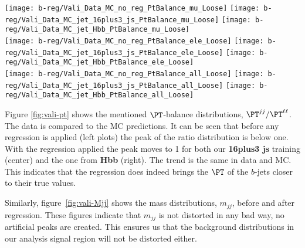 \begin{figure*}[thb]
  \centering
  \texttt{[image: b-reg/Vali\_Data\_MC\_no\_reg\_PtBalance\_mu\_Loose]}\hfil
  \texttt{[image: b-reg/Vali\_Data\_MC\_jet\_16plus3\_js\_PtBalance\_mu\_Loose]}\hfil
  \texttt{[image: b-reg/Vali\_Data\_MC\_jet\_Hbb\_PtBalance\_mu\_Loose]}\hfil\\
  \texttt{[image: b-reg/Vali\_Data\_MC\_no\_reg\_PtBalance\_ele\_Loose]}\hfil
  \texttt{[image: b-reg/Vali\_Data\_MC\_jet\_16plus3\_js\_PtBalance\_ele\_Loose]}\hfil
  \texttt{[image: b-reg/Vali\_Data\_MC\_jet\_Hbb\_PtBalance\_ele\_Loose]}\hfil\\
  \texttt{[image: b-reg/Vali\_Data\_MC\_no\_reg\_PtBalance\_all\_Loose]}\hfil
  \texttt{[image: b-reg/Vali\_Data\_MC\_jet\_16plus3\_js\_PtBalance\_all\_Loose]}\hfil
  \texttt{[image: b-reg/Vali\_Data\_MC\_jet\_Hbb\_PtBalance\_all\_Loose]}\hfil\\
  \caption{Pt balance (ratio) of the di-jet and di-lepton. On the left
    are plots with no regression, in the center - using
    \textbf{16plus3 js} training and on the right - using \textbf{Hbb}
    regression.  Top plots for muon channel, middle for electron
    channel and bottom is the combination (sum) of the two.  }
  \label{fig:vali-pt}
\end{figure*}


Figure \ref{fig:vali-pt} shows the mentioned $\PT$-balance
distributions, $\PT^{jj}/\PT^{\ell\ell}$.  The data is compared to the
MC predictions. It can be seen that before any regression is applied
(left plots) the peak of the ratio distribution is below one. With the
regression applied the peak moves to 1 for both our \textbf{16plus3
  js} training (center) and the one from \textbf{Hbb} (right). The
trend is the same in data and MC.  This indicates that the regression
does indeed brings the $\PT$ of the $b$-jets closer to their true
values.

Similarly, figure~\ref{fig:vali-Mjj} shows the mass distributions,
$m_{jj}$, before and after regression. These figures indicate that
$m_{jj}$ is not distorted in any bad way, no artificial peaks are
created. This ensures us that the background distributions in our
analysis signal region will not be distorted either.

